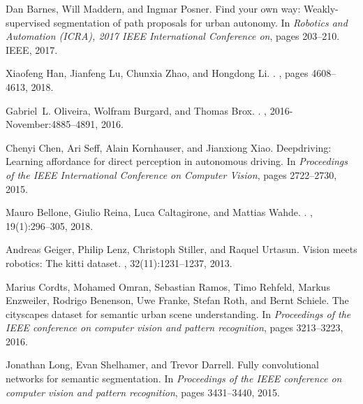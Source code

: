 \documentclass[letterpaper, 10 pt, conference]{ieeeconf}  %
\begin{document}
\begin{thebibliography}{99}
	Dan Barnes, Will Maddern, and Ingmar Posner.
	\newblock Find your own way: Weakly-supervised segmentation of path proposals
	for urban autonomy.
	\newblock In {\em Robotics and Automation (ICRA), 2017 IEEE International
		Conference on}, pages 203--210. IEEE, 2017.
	
	Xiaofeng Han, Jianfeng Lu, Chunxia Zhao, and Hongdong Li.
	.
	, pages 4608--4613, 2018.
	
	Gabriel~L. Oliveira, Wolfram Burgard, and Thomas Brox.
	.
	, 2016-November:4885--4891, 2016.
	
	Chenyi Chen, Ari Seff, Alain Kornhauser, and Jianxiong Xiao.
	\newblock Deepdriving: Learning affordance for direct perception in autonomous
	driving.
	\newblock In {\em Proceedings of the IEEE International Conference on Computer
		Vision}, pages 2722--2730, 2015.
	
	Mauro Bellone, Giulio Reina, Luca Caltagirone, and Mattias Wahde.
	.
	,
	19(1):296--305, 2018.
	
	Andreas Geiger, Philip Lenz, Christoph Stiller, and Raquel Urtasun.
	\newblock Vision meets robotics: The kitti dataset.
	,
	32(11):1231--1237, 2013.
	
	Marius Cordts, Mohamed Omran, Sebastian Ramos, Timo Rehfeld, Markus Enzweiler,
	Rodrigo Benenson, Uwe Franke, Stefan Roth, and Bernt Schiele.
	\newblock The cityscapes dataset for semantic urban scene understanding.
	\newblock In {\em Proceedings of the IEEE conference on computer vision and
		pattern recognition}, pages 3213--3223, 2016.
	
	Jonathan Long, Evan Shelhamer, and Trevor Darrell.
	\newblock Fully convolutional networks for semantic segmentation.
	\newblock In {\em Proceedings of the IEEE conference on computer vision and
		pattern recognition}, pages 3431--3440, 2015.
	
\end{thebibliography}
\end{document}
